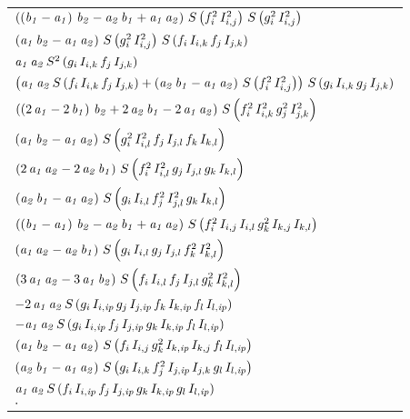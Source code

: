 \documentclass[12pt]{article}
\begin{document}
 \begin{longtable}{l}
$\left(\left({\it b_1}-{\it a_1}\right)\,{\it b_2}-{\it a_2}\,
 {\it b_1}+{\it a_1}\,{\it a_2}\right)\,S\left(f_{i}^2\,I_{i,j}^2
 \right)\,S\left(g_{i}^2\,I_{i,j}^2\right)$
\\
$\left({\it a_1}\,{\it b_2}-{\it a_1}\,{\it a_2}\right)\,S\left(g_{i
 }^2\,I_{i,j}^2\right)\,S\left(f_{i}\,I_{i,k}\,f_{j}\,I_{j,k}\right)$
\\
${\it a_1}\,{\it a_2}\,S^2\left(g_{i}\,I_{i,k}\,f_{j}\,I_{j,k}
 \right)$
\\
$\left({\it a_1}\,{\it a_2}\,S\left(f_{i}\,I_{i,k}\,f_{j}\,I_{j,k}
 \right)+\left({\it a_2}\,{\it b_1}-{\it a_1}\,{\it a_2}\right)\,S
 \left(f_{i}^2\,I_{i,j}^2\right)\right)\,S\left(g_{i}\,I_{i,k}\,g_{j}
 \,I_{j,k}\right)$
\\
$\left(\left(2\,{\it a_1}-2\,{\it b_1}\right)\,{\it b_2}+2\,
 {\it a_2}\,{\it b_1}-2\,{\it a_1}\,{\it a_2}\right)\,S\left(f_{i}^2
 \,I_{i,k}^2\,g_{j}^2\,I_{j,k}^2\right)$
\\
$\left({\it a_1}\,{\it b_2}-{\it a_1}\,{\it a_2}\right)\,S\left(g_{i
 }^2\,I_{i,l}^2\,f_{j}\,I_{j,l}\,f_{k}\,I_{k,l}\right)$
\\
$\left(2\,{\it a_1}\,{\it a_2}-2\,{\it a_2}\,{\it b_1}\right)\,S
 \left(f_{i}^2\,I_{i,l}^2\,g_{j}\,I_{j,l}\,g_{k}\,I_{k,l}\right)$
\\
$\left({\it a_2}\,{\it b_1}-{\it a_1}\,{\it a_2}\right)\,S\left(g_{i
 }\,I_{i,l}\,f_{j}^2\,I_{j,l}^2\,g_{k}\,I_{k,l}\right)$
\\
$\left(\left({\it b_1}-{\it a_1}\right)\,{\it b_2}-{\it a_2}\,
 {\it b_1}+{\it a_1}\,{\it a_2}\right)\,S\left(f_{i}^2\,I_{i,j}\,I_{i
 ,l}\,g_{k}^2\,I_{k,j}\,I_{k,l}\right)$
\\
$\left({\it a_1}\,{\it a_2}-{\it a_2}\,{\it b_1}\right)\,S\left(g_{i
 }\,I_{i,l}\,g_{j}\,I_{j,l}\,f_{k}^2\,I_{k,l}^2\right)$
\\
$\left(3\,{\it a_1}\,{\it a_2}-3\,{\it a_1}\,{\it b_2}\right)\,S
 \left(f_{i}\,I_{i,l}\,f_{j}\,I_{j,l}\,g_{k}^2\,I_{k,l}^2\right)$
\\
$-2\,{\it a_1}\,{\it a_2}\,S\left(g_{i}\,I_{i,{\it ip}}\,g_{j}\,I_{j
 ,{\it ip}}\,f_{k}\,I_{k,{\it ip}}\,f_{l}\,I_{l,{\it ip}}\right)$
\\
$-{\it a_1}\,{\it a_2}\,S\left(g_{i}\,I_{i,{\it ip}}\,f_{j}\,I_{j,
 {\it ip}}\,g_{k}\,I_{k,{\it ip}}\,f_{l}\,I_{l,{\it ip}}\right)$
\\
$\left({\it a_1}\,{\it b_2}-{\it a_1}\,{\it a_2}\right)\,S\left(f_{i
 }\,I_{i,j}\,g_{k}^2\,I_{k,{\it ip}}\,I_{k,j}\,f_{l}\,I_{l,{\it ip}}
 \right)$
\\
$\left({\it a_2}\,{\it b_1}-{\it a_1}\,{\it a_2}\right)\,S\left(g_{i
 }\,I_{i,k}\,f_{j}^2\,I_{j,{\it ip}}\,I_{j,k}\,g_{l}\,I_{l,{\it ip}}
 \right)$
\\
${\it a_1}\,{\it a_2}\,S\left(f_{i}\,I_{i,{\it ip}}\,f_{j}\,I_{j,
 {\it ip}}\,g_{k}\,I_{k,{\it ip}}\,g_{l}\,I_{l,{\it ip}}\right)$
\\
$\cdot$
\end{longtable}
\end{document}
